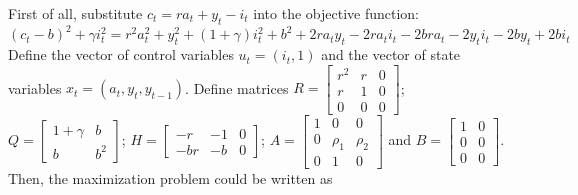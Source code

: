 \documentclass[]{article}
\begin{document}
First of all, substitute $c_t = ra_t + y_t - i_t$ into the objective function:
\begin{equation}
	(c_t - b)^2 + \gamma i_t^2 = r^2a_t^2 + y_t^2 + (1 + \gamma)i_t^2 + b^2 + 2ra_ty_t - 2ra_ti_t - 2bra_t - 2y_ti_t - 2by_t + 2bi_t \nonumber
\end{equation}
Define the vector of control variables $u_t = (i_t, 1)$ and the vector of state variables $x_t = (a_t, y_t, y_{t-1})$. Define matrices $R = \begin{bmatrix}r^2 & r & 0 \\ r & 1 & 0 \\ 0 & 0 & 0\end{bmatrix}$; $Q = \begin{bmatrix} 1 + \gamma & b \\ b & b^2 \end{bmatrix}$; $H = \begin{bmatrix}-r & -1 & 0 \\ -br & -b & 0\end{bmatrix}$; $A = \begin{bmatrix}1 & 0 & 0 \\ 0 & \rho_1 & \rho_2 \\ 0 & 1 & 0\end{bmatrix}$ and $B = \begin{bmatrix} 1 & 0 \\ 0 & 0 \\ 0 & 0\end{bmatrix}$. Then, the maximization problem could be written as
\end{document}
